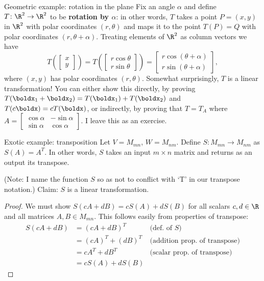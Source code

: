\begin{frame}{Geometric example: \alert{rotation in the plane}}
Fix an angle $\alpha$ and define $T\colon \R^2\rightarrow \R^2$ to be {\bf rotation by $\alpha$}: in other words, $T$ takes a point $P=(x,y)$ in $\R^2$ with polar coordinates $(r, \theta)$ and maps it to the point $T(P)=Q$ with polar coordinates $(r, \theta+\alpha)$. 
\bpause 
Treating elements of $\R^2$ as column vectors we have 
\[
T\left (\begin{bmatrix}
x \\ y
\end{bmatrix}
\right)=T\left( \begin{bmatrix}
r\cos \theta\\
r\sin \theta
\end{bmatrix}
\right)=\begin{bmatrix}
r\cos(\theta+\alpha)\\
r\sin(\theta+\alpha)
\end{bmatrix}, 
\]
where $(x,y)$ has polar coordinates $(r,\theta)$.
\bpause
Somewhat surprisingly, $T$ is a linear transformation! 
\bpause 
You can either show this directly, by proving $T(\boldx_1+\boldx_2)=T(\boldx_1)+T(\boldx_2)$ and $T(c\boldx)=cT(\boldx)$, or indirectly, by proving that $T=T_A$ where $A=\begin{bmatrix}
\cos\alpha&-\sin\alpha\\
\sin\alpha&\cos\alpha
\end{bmatrix}$.  
\bspace I leave this as an exercise. 
\end{frame}
\begin{frame}{Exotic example: \alert{transposition}}
Let $V=M_{mn}$, $W=M_{nm}$. Define $S\colon M_{mn}\rightarrow M_{nm}$ as $S(A)=A^T$.
\bspace
In other words, $S$ takes an input $m\times n$ matrix and returns as an output its transpose. 

(Note: I name the function $S$ so as not to conflict with `T' in our transpose notation.) 
\bpause
\alert{Claim}: $S$ is a linear transformation. 
\pause \begin{proof}
We must show $S(cA+dB)=cS(A)+dS(B)$ for all scalars $c,d\in\R$ and all matrices $A, B\in M_{mn}$. This follows easily from properties of transpose:
\begin{align*}
S(cA+dB)&=(cA+dB)^T &\text{(def. of $S$)}\\
&=(cA)^T+(dB)^T &\text{(addition prop. of transpose)}\\
&=cA^T+dB^T &\text{(scalar prop. of transpose)}\\
&=cS(A)+dS(B)
\end{align*}
\end{proof}
\end{frame}
